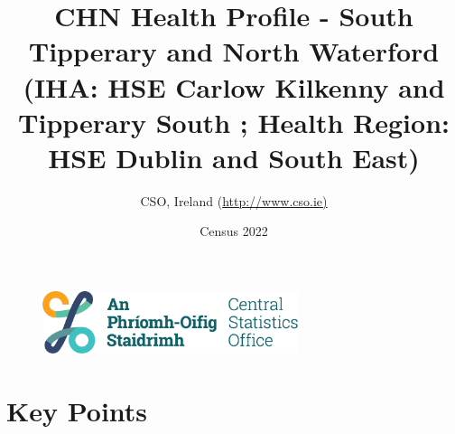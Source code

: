 \documentclass{article}
\title{CHN Health Profile - South Tipperary and North Waterford (IHA: HSE Carlow Kilkenny and Tipperary South ;  Health Region: HSE Dublin and South East) }
\date{Census 2022}
\author{CSO, Ireland  (\url{http://www.cso.ie)}}
\begin{document}


\begin{figure}
	\centering
\includegraphics[width =75mm]{../figures/CSO_Logo.png}
\end{figure}

				 
		   
						  
														  
																																													
												 
			 
\maketitle
					
													   
				 
						 
																																																																											   
				 
				  
  \pagebreak
    	    \tableofcontents

\pagebreak


\section{Key Points}
\end{document}
